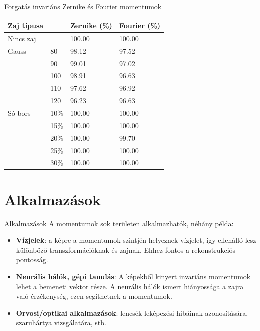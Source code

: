 \documentclass{beamer}
\begin{document}
\begin{frame}{Forgatás invariáns Zernike és Fourier momentumok}
    \vskip 1cm
    \begin{table}[tbp]
        \centering
        \begin{tabular}{|p{2cm}|p{1.5cm}|p{2.2cm}<{\raggedright}|p{2cm}|} \hline
            \textbf{Zaj típusa} & & \textbf{Zernike} (\%) & \textbf{Fourier} (\%) \\ \hline\hline
            Nincs zaj & & 100.00 & 100.00 \\ \hline\hline
            Gauss & 80 & 98.12 & 97.52 \\ \cline{2-4}
            & 90 & 99.01 & 97.02 \\ \cline{2-4}
            & 100 & 98.91 & 96.63 \\ \cline{2-4}
            & 110 & 97.62 & 96.92 \\ \cline{2-4}
            & 120 & 96.23 & 96.63 \\ \hline\hline
            Só-bors & 10\% & 100.00 & 100.00 \\ \cline{2-4}
            & 15\% & 100.00 & 100.00 \\ \cline{2-4}
            & 20\% & 100.00 & 99.70 \\ \cline{2-4}
            & 25\% & 100.00 & 100.00 \\ \cline{2-4}
            & 30\% & 100.00 & 100.00 \\ \cline{1-4}
        \end{tabular}
    \end{table}
\end{frame}

\section{Alkalmazások}
\begin{frame}{Alkalmazások}
    A momentumok sok területen alkalmazhatók, néhány példa:
    \begin{itemize}
    \item \textbf{Vízjelek}: a képre a momentumok szintjén helyeznek vízjelet, így ellenálló lesz különböző transzformációknak és zajnak. Ehhez fontos a rekonstrukciós pontosság.~\cite{watermarking_auth}
    \item \textbf{Neurális hálók, gépi tanulás}: A képekből kinyert invariáns momentumok lehet a bemeneti vektor része. A neurális hálók ismert hiányossága a zajra való érzékenység, ezen segíthetnek a momentumok.~\cite{nn_noise_robust}
    \item \textbf{Orvosi/optikai alkalmazások}: lencsék leképezési hibáinak azonosítására, szaruhártya vizsgálatára, stb.~\cite{wavefront}
    \end{itemize}
\end{frame}
\end{document}
